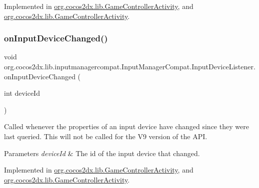 Implemented in \hyperlink{classorg_1_1cocos2dx_1_1lib_1_1GameControllerActivity_a26ce9a1e1b6f4a726d6c775633a80b03}{org.\+cocos2dx.\+lib.\+Game\+Controller\+Activity}, and \hyperlink{classorg_1_1cocos2dx_1_1lib_1_1GameControllerActivity_a26ce9a1e1b6f4a726d6c775633a80b03}{org.\+cocos2dx.\+lib.\+Game\+Controller\+Activity}.

\mbox{\label{interfaceorg_1_1cocos2dx_1_1lib_1_1inputmanagercompat_1_1InputManagerCompat_1_1InputDeviceListener_af65cf1e0f73f2a7326a8ea62f6764361}} 
\subsubsection{\texorpdfstring{on\+Input\+Device\+Changed()}{onInputDeviceChanged()}\hspace{0.1cm}{\footnotesize\ttfamily [2/2]}}
{\footnotesize\ttfamily void org.\+cocos2dx.\+lib.\+inputmanagercompat.\+Input\+Manager\+Compat.\+Input\+Device\+Listener.\+on\+Input\+Device\+Changed (\begin{DoxyParamCaption}\item[{int}]{device\+Id }\end{DoxyParamCaption})}

Called whenever the properties of an input device have changed since they were last queried. This will not be called for the V9 version of the A\+PI.


\begin{DoxyParams}{Parameters}
{\em device\+Id} & The id of the input device that changed. \\
\hline
\end{DoxyParams}


Implemented in \hyperlink{classorg_1_1cocos2dx_1_1lib_1_1GameControllerActivity_a26ce9a1e1b6f4a726d6c775633a80b03}{org.\+cocos2dx.\+lib.\+Game\+Controller\+Activity}, and \hyperlink{classorg_1_1cocos2dx_1_1lib_1_1GameControllerActivity_a26ce9a1e1b6f4a726d6c775633a80b03}{org.\+cocos2dx.\+lib.\+Game\+Controller\+Activity}.

